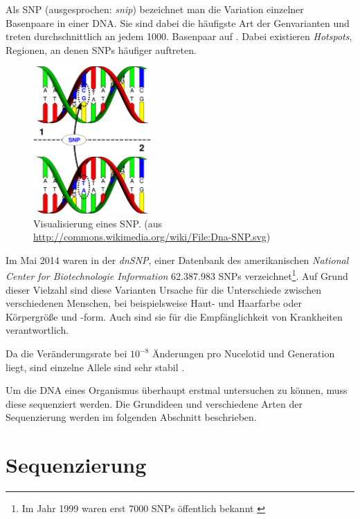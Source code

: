 Als SNP (ausgesprochen: \textit{snip}) bezeichnet man die Variation einzelner Basenpaare in einer DNA. Sie sind dabei die häufigste Art der Genvarianten und treten durchschnittlich an jedem 1000. Basenpaar auf \citep{Knippers2006}. Dabei existieren \textit{Hotspots}, Regionen, an denen SNPs häufiger auftreten. 
\begin{figure}[H]
	\begin{center}
		\includegraphics[width=0.4\textwidth]{bilder/DNA_SNP}
	\end{center}
	\caption[Visualisierung eines SNP. (aus \protect\url{http://commons.wikimedia.org/wiki/File:Dna-SNP.svg})]{Visualisierung eines SNP. (aus \protect\url{http://commons.wikimedia.org/wiki/File:Dna-SNP.svg})}
	\label{fig:bio:muta:snp}
\end{figure}
Im Mai 2014 waren in der \textit{dnSNP}, einer Datenbank des amerikanischen \textit{National Center for Biotechnologie Information} \citet{NCBI2014} 62.387.983 SNPs verzeichnet\footnote{Im Jahr 1999 waren erst 7000 SNPs öffentlich bekannt \citep{Brookes1999}}. Auf Grund dieser Vielzahl sind diese Varianten Ursache für die Unterschiede zwischen verschiedenen Menschen, bei beispielsweise Haut- und Haarfarbe oder Körpergröße und -form. Auch sind sie für die Empfänglichkeit von Krankheiten verantwortlich.

Da die Veränderungsrate bei $10^{-8}$ Änderungen pro Nucelotid und Generation liegt, sind einzelne Allele sind sehr stabil \citep{Brookes1999} \citep{Li1996}. 

Um die DNA eines Organismus überhaupt erstmal untersuchen zu können, muss diese sequenziert werden. Die Grundideen und verschiedene Arten der Sequenzierung werden im folgenden Abschnitt beschrieben.
\section{Sequenzierung}
\label{sec:bio:seq}


